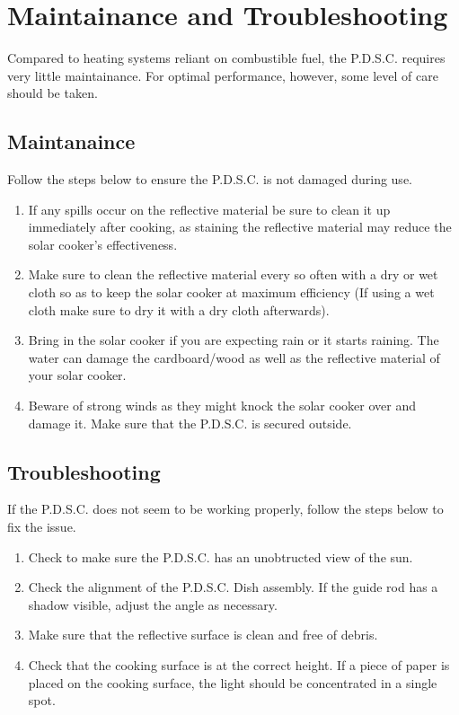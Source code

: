 \documentclass[titlepage]{article}
\begin{document}
    \section{Maintainance and Troubleshooting}
        Compared to heating systems reliant on combustible fuel, the P.D.S.C. requires very little maintainance. For optimal performance, however, some level of care should be taken.
        \subsection{Maintanaince}    
            Follow the steps below to ensure the P.D.S.C. is not damaged during use.
                \begin{enumerate}
                    \item If any spills occur on the reflective material be sure to clean it up immediately after cooking, as staining the reflective material may reduce the solar cooker’s effectiveness.
                    \item Make sure to clean the reflective material every so often with a dry or wet cloth so as to keep the solar cooker at maximum efficiency (If using a wet cloth make sure to dry it with a dry cloth afterwards).
                    \item Bring in the solar cooker if you are expecting rain or it starts raining. The water can damage the cardboard/wood as well as the reflective material of your solar cooker.
                    \item Beware of strong winds as they might knock the solar cooker over and damage it. Make sure that the P.D.S.C. is secured outside.

                \end{enumerate}
        \subsection{Troubleshooting}
            If the P.D.S.C. does not seem to be working properly, follow the steps below to fix the issue.
            \begin{enumerate}
                \item Check to make sure the P.D.S.C. has an unobtructed view of the sun.
                \item Check the alignment of the P.D.S.C. Dish assembly.  If the guide rod has a shadow visible, adjust the angle as necessary.
                \item Make sure that the reflective surface is clean and free of debris.
                \item Check that the cooking surface is at the correct height. If a piece of paper is placed on the cooking surface, the light should be concentrated in a single spot.
            \end{enumerate}
\end{document}
